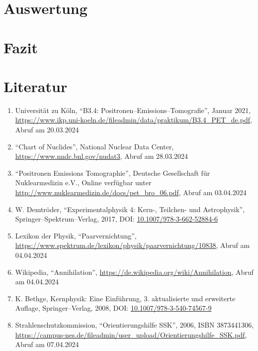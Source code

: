 \documentclass[12pt,a4paper]{scrartcl}
\numberwithin{equation}{section} %
\renewcommand{\[}{} %
\renewcommand{\]}{\noindent} %
\newcommand{\tightlist}{} %
\begin{document}
\clearpage
\hypertarget{auswertung}{%
\section{Auswertung}\label{auswertung}}

\clearpage
\hypertarget{fazit}{%
\section{Fazit}\label{fazit}}

\clearpage
\hypertarget{literatur}{%
\section{Literatur}\label{literatur}}

\begin{enumerate}
\def\labelenumi{\arabic{enumi}.}
\tightlist
\item
  Universität zu Köln, ``B3.4: Positronen--Emissions--Tomografie'',
  Januar 2021,
  \url{https://www.ikp.uni-koeln.de/fileadmin/data/praktikum/B3.4\_PET\_de.pdf},
  Abruf am 20.03.2024
\item
  ``Chart of Nuclides'', National Nuclear Data Center,
  \url{https://www.nndc.bnl.gov/nudat3}, Abruf am 28.03.2024
\item
  ``Positronen Emissions Tomographie'', Deutsche Gesellschaft für
  Nuklearmedizin e.V., Online verfügbar unter
  \url{http://www.nuklearmedizin.de/docs/pet_bro_06.pdf}, Abruf am
  03.04.2024
\item
  W. Demtröder, ``Experimentalphysik 4: Kern-, Teilchen- und
  Astrophysik'', Springer--Spektrum--Verlag, 2017, DOI:
  \href{https://link.springer.com/book/10.1007/978-3-662-52884-6}{10.1007/978-3-662-52884-6}
\item
  Lexikon der Physik, ``Paarvernichtung'',
  \url{https://www.spektrum.de/lexikon/physik/paarvernichtung/10838},
  Abruf am 04.04.2024
\item
  Wikipedia, ``Annihilation'',
  \url{https://de.wikipedia.org/wiki/Annihilation}, Abruf am 04.04.2024
\item
  K. Bethge, Kernphysik: Eine Einführung, 3. aktualisierte und
  erweiterte Auflage, Springer--Verlag, 2008, DOI:
  \href{https://doi.org/10.1007/978-3-540-74567-9}{10.1007/978-3-540-74567-9}
\item
  Strahlenschutzkommission, ``Orientierungshilfe SSK'', 2006, ISBN 3873441306,
  \url{https://campus-nes.de/fileadmin/user_upload/Orientierungshilfe_SSK.pdf}, Abruf am 07.04.2024

\end{enumerate}
\end{document}
